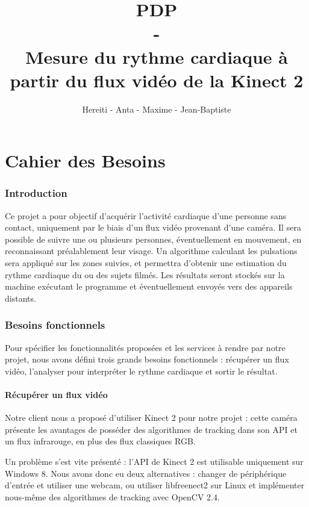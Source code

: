 \documentclass[12pt,a4paper]{article}
\title{PDP \\ - \\ Mesure du rythme cardiaque à partir du flux vidéo de la Kinect 2}
\author{Hereiti \bsc{Hatitio} - Anta \bsc{Mbaye} - Maxime \bsc{Vincent} - Jean-Baptiste \bsc{Rey}}
\begin{document}
\maketitle
\newpage
\tableofcontents
\newpage
\part{Cahier des Besoins}

\section*{Introduction}

Ce projet a pour objectif d'acquérir l'activité cardiaque d'une personne sans contact, uniquement par le biais d'un flux vidéo provenant d'une caméra.
Il sera possible de suivre une ou plusieurs personnes, éventuellement en mouvement, en reconnaissant préalablement leur visage. Un algorithme calculant les pulsations sera appliqué sur les zones suivies, et permettra d'obtenir une estimation du rythme cardiaque du ou des sujets filmés. Les résultats seront stockés sur la machine exécutant le programme et éventuellement envoyés vers des appareils distants.  

\section{Besoins fonctionnels}
Pour spécifier les fonctionnalités proposées et les services à rendre par notre projet, nous avons défini trois grands besoins fonctionnels : récupérer un flux vidéo, l'analyser pour interpréter le rythme cardiaque et sortir le résultat.

\subsection{Récupérer un flux vidéo}
Notre client nous a proposé d'utiliser Kinect 2 pour notre projet : cette caméra présente les avantages de posséder des algorithmes de tracking dans son API et un flux infrarouge, en plus des flux classiques RGB.

Un problème s'est vite présenté : l'API de Kinect 2 est utilisable uniquement sur Windows 8. Nous avons donc eu deux alternatives : changer de périphérique d'entrée et utiliser une webcam, ou utiliser libfreenect2 sur Linux et implémenter nous-même des algorithmes de tracking avec OpenCV 2.4.
\end{document}
